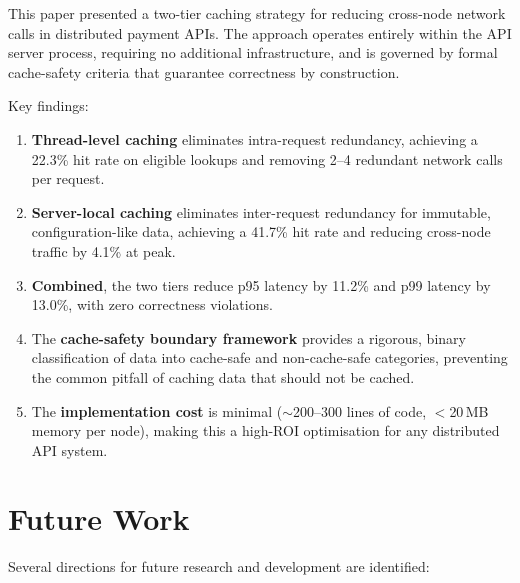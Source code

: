 \documentclass[12pt,a4paper]{report}
\begin{document}
This paper presented a two-tier caching strategy for reducing cross-node network calls in distributed payment APIs. The approach operates entirely within the API server process, requiring no additional infrastructure, and is governed by formal cache-safety criteria that guarantee correctness by construction.

Key findings:

\begin{enumerate}
    \item \textbf{Thread-level caching} eliminates intra-request redundancy, achieving a 22.3\% hit rate on eligible lookups and removing 2–4 redundant network calls per request.

    \item \textbf{Server-local caching} eliminates inter-request redundancy for immutable, configuration-like data, achieving a 41.7\% hit rate and reducing cross-node traffic by 4.1\% at peak.

    \item \textbf{Combined}, the two tiers reduce p95 latency by 11.2\% and p99 latency by 13.0\%, with zero correctness violations.

    \item The \textbf{cache-safety boundary framework} provides a rigorous, binary classification of data into cache-safe and non-cache-safe categories, preventing the common pitfall of caching data that should not be cached.

    \item The \textbf{implementation cost} is minimal ($\sim$200–300 lines of code, $<$20\,MB memory per node), making this a high-ROI optimisation for any distributed API system.
\end{enumerate}

\section{Future Work}

Several directions for future research and development are identified:
\end{document}
